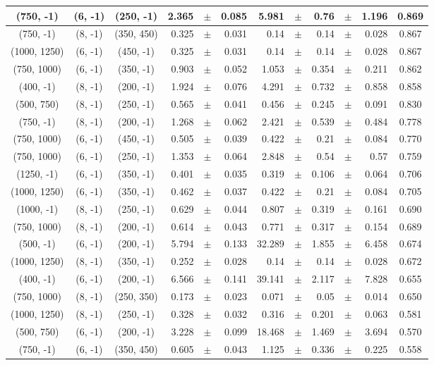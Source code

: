 \documentclass[12pt]{paper}
\begin{document}
\begin{table}[ht]
\begin{center}
{\begin{tabular}{|c|c|c|rrr|rrrrr|c|}
(750, -1)&(6, -1)&(250, -1)&2.365&$\pm$&0.085&5.981&$\pm$&0.76&$\pm$&1.196&0.869\\\hline
(750, -1)&(8, -1)&(350, 450)&0.325&$\pm$&0.031&0.14&$\pm$&0.14&$\pm$&0.028&0.867\\\hline
(1000, 1250)&(6, -1)&(450, -1)&0.325&$\pm$&0.031&0.14&$\pm$&0.14&$\pm$&0.028&0.867\\\hline
(750, 1000)&(6, -1)&(350, -1)&0.903&$\pm$&0.052&1.053&$\pm$&0.354&$\pm$&0.211&0.862\\\hline
(400, -1)&(8, -1)&(200, -1)&1.924&$\pm$&0.076&4.291&$\pm$&0.732&$\pm$&0.858&0.858\\\hline
(500, 750)&(8, -1)&(250, -1)&0.565&$\pm$&0.041&0.456&$\pm$&0.245&$\pm$&0.091&0.830\\\hline
(750, -1)&(8, -1)&(200, -1)&1.268&$\pm$&0.062&2.421&$\pm$&0.539&$\pm$&0.484&0.778\\\hline
(750, 1000)&(6, -1)&(450, -1)&0.505&$\pm$&0.039&0.422&$\pm$&0.21&$\pm$&0.084&0.770\\\hline
(750, 1000)&(6, -1)&(250, -1)&1.353&$\pm$&0.064&2.848&$\pm$&0.54&$\pm$&0.57&0.759\\\hline
(1250, -1)&(6, -1)&(350, -1)&0.401&$\pm$&0.035&0.319&$\pm$&0.106&$\pm$&0.064&0.706\\\hline
(1000, 1250)&(6, -1)&(350, -1)&0.462&$\pm$&0.037&0.422&$\pm$&0.21&$\pm$&0.084&0.705\\\hline
(1000, -1)&(8, -1)&(250, -1)&0.629&$\pm$&0.044&0.807&$\pm$&0.319&$\pm$&0.161&0.690\\\hline
(750, 1000)&(8, -1)&(200, -1)&0.614&$\pm$&0.043&0.771&$\pm$&0.317&$\pm$&0.154&0.689\\\hline
(500, -1)&(6, -1)&(200, -1)&5.794&$\pm$&0.133&32.289&$\pm$&1.855&$\pm$&6.458&0.674\\\hline
(1000, 1250)&(8, -1)&(350, -1)&0.252&$\pm$&0.028&0.14&$\pm$&0.14&$\pm$&0.028&0.672\\\hline
(400, -1)&(6, -1)&(200, -1)&6.566&$\pm$&0.141&39.141&$\pm$&2.117&$\pm$&7.828&0.655\\\hline
(750, 1000)&(8, -1)&(250, 350)&0.173&$\pm$&0.023&0.071&$\pm$&0.05&$\pm$&0.014&0.650\\\hline
(1000, 1250)&(8, -1)&(250, -1)&0.328&$\pm$&0.032&0.316&$\pm$&0.201&$\pm$&0.063&0.581\\\hline
(500, 750)&(6, -1)&(200, -1)&3.228&$\pm$&0.099&18.468&$\pm$&1.469&$\pm$&3.694&0.570\\\hline
(750, -1)&(6, -1)&(350, 450)&0.605&$\pm$&0.043&1.125&$\pm$&0.336&$\pm$&0.225&0.558\\\hline

\end{tabular}}
\end{center}
\end{table}
\end{document}
